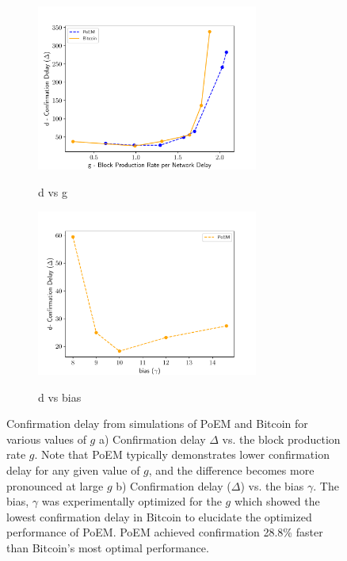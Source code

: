 \begin{figure}
    \centering
    \begin{subfigure}{0.49\textwidth}
    \centering
    \caption{d vs g}
    \includegraphics[width = 0.8\textwidth]{figures/dvsg.pdf}
    \label{fig:dvsg}
    \end{subfigure}
    \begin{subfigure}{0.49\textwidth}
    \centering
    \caption{d vs bias}
    \includegraphics[width = 0.8\textwidth]{figures/gamma.pdf}
    \label{fig:right}
    \end{subfigure}
    \caption{Confirmation delay from simulations of PoEM and Bitcoin for various values of $g$ a) Confirmation delay $\Delta$ vs. the block production rate $g$. Note that PoEM typically demonstrates lower confirmation delay for any given value of $g$, and the difference becomes more pronounced at large $g$ b) Confirmation delay ($\Delta$) vs. the bias $\gamma$. The bias, $\gamma$ was experimentally optimized for the $g$ which showed the lowest confirmation delay in Bitcoin to elucidate the optimized performance of PoEM. PoEM achieved confirmation 28.8\% faster than Bitcoin's most optimal performance.}
    \label{fig:gamma}
\end{figure}

